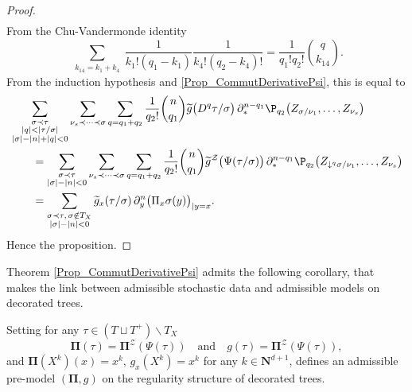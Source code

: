 \documentclass[11pt]{preprint}
\newcommand{\mcZ}{\mathcal{Z}}
\def\PPi{\boldsymbol{\Pi}}
\newcommand{\bfN}{\mathbf{N}}
\begin{document}
\begin{proof}
\begin{align*}
\end{align*}
From the Chu-Vandermonde identity
$$
\sum_{\substack{ k_{14} = k_1+k_4      }} \frac{1}{k_1!(q_1-k_1)} \frac{1}{k_4! (q_2-k_4)!}= \frac{1}{ q_1!q_2! } \binom{q}{k_{14}}.
$$
From the induction hypothesis and \ref{Prop_CommutDerivativePsi}, this is equal to 
\begin{align*}
	&\sum_{\substack{\sigma\prec\tau \\ |q|<|\tau/\sigma| \\  |\sigma|-|n|+|q|<0 }}\sum_{\nu_s\prec\dots\prec\sigma}\sum_{q=q_1+q_2} \frac{1}{q_2!}\binom{n}{q_1}  \widetilde{ g}\big(D^{q}\tau/\sigma\big) \, \partial^{n-q_1}_*\P_{q_2}\big(Z_{\sigma/\nu_1},\dots, Z_{\nu_s}   \big)
	\\
	&\qquad= \sum_{\substack{\sigma\prec\tau \\  |\sigma|-|n|<0 }}\sum_{\nu_s\prec\dots\prec\sigma}\sum_{q=q_1+q_2} \frac{1}{q_2!}\binom{n}{q_1}  \widetilde{ g}^\mcZ\big(\Psi(\tau/\sigma)\big) \,   \partial^{n-q_1}_*\P_{q_2}\big(Z_{\downarrow^{q}\sigma/\nu_1},\dots, Z_{\nu_s}   \big)
	\\
	&\qquad =
	\sum_{\substack{\sigma\prec\tau, \, \sigma\notin T_X\\ |\sigma|-|n|<0}} \widetilde{ g}_x(\tau/\sigma) \, \partial^n_y\big( { \Pi}_x\sigma(y)\big)_{|y=x}.
\end{align*}
Hence the proposition.
\end{proof}






Theorem \ref{Prop_CommutDerivativePsi} admits the following corollary, that makes the link between admissible stochastic data and admissible models on decorated trees.  
	\begin{corollary} \label{PPi_Psi}
	Setting for any $\tau\in (T\sqcup T^+)\backslash T_X$
	$$
	{ \PPi}(\tau) = { \PPi}^\mcZ (\Psi(\tau)) \quad\text{and}\quad { g }(\tau) = { \PPi }^\mcZ(\Psi(\tau)), 
	$$
	and $\PPi(X^k)(x)=x^k, \, g_x(X^k)=x^k$ for any $k\in\bfN^{d+1}$, defines an admissible pre-model ${ (\PPi,g)}$  on the regularity structure of decorated trees.
\end{corollary}
\end{document}
